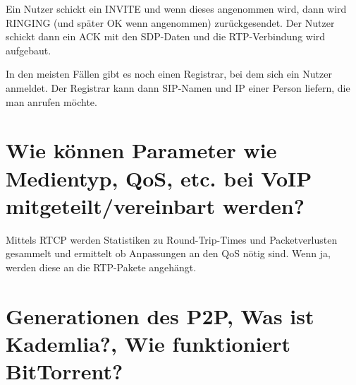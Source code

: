 \documentclass{article}
\begin{document}
	Ein Nutzer schickt ein INVITE und wenn dieses angenommen wird, dann wird RINGING (und später OK wenn angenommen) zurückgesendet. Der Nutzer schickt dann ein ACK mit den SDP-Daten und die RTP-Verbindung wird aufgebaut.
	
	In den meisten Fällen gibt es noch einen Registrar, bei dem sich ein Nutzer anmeldet. Der Registrar kann dann SIP-Namen und IP einer Person liefern, die man anrufen möchte.
	
	\section*{Wie können Parameter wie Medientyp, QoS, etc. bei VoIP mitgeteilt/vereinbart werden?}
	
	Mittels RTCP werden Statistiken zu Round-Trip-Times und Packetverlusten gesammelt und ermittelt ob Anpassungen an den QoS nötig sind. Wenn ja, werden diese an die RTP-Pakete angehängt.
	
	\section*{Generationen des P2P, Was ist Kademlia?, Wie funktioniert BitTorrent?}
	
\end{document}
